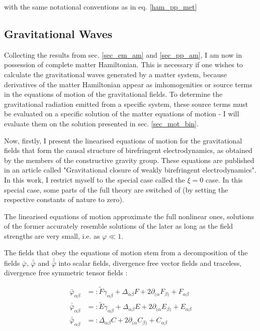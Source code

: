 \documentclass[11pt]{article}
\begin{document}
with the same notational conventions as in eq. \ref{ham_pp_met}

\subsection{Gravitational Waves}

Collecting the results from sec. \ref{sec_em_am} and \ref{sec_pp_am}, I am now in possession of complete matter Hamiltonian. This is necessary if one wishes to calculate the gravitational waves generated by a matter system, because derivatives of the matter Hamiltonian appear as imhomogenities or source terms in the equations of motion of the gravitational fields. To determine the gravitational radiation emitted from a specific system, these source terms must be evaluated on a specific solution of the matter equations of motion - I will evaluate them on the solution presented in sec. \ref{sec_mot_bin}.

Now, firstly, I present the linearised equations of motion for the gravitational fields that form the causal structure of birefringent electrodynamics, as obtained by the members of the constructive gravity group. These equations are published in an article called "Gravitational closure of weakly birefringent electrodynamics". In this work, I restrict myself to the special case called the $\xi = 0$ case. In this special case, some parts of the full theory are switched of (by setting the respective constants of nature to zero).

The linearised equations of motion approximate the full nonlinear ones, solutions of the former accurately resemble solutions of the later as long as the field strengths are very small, i.e. as $\varphi \ll 1$.

The fields that obey the equations of motion stem from a decomposition of the fields $\bar{\varphi}$, $\bar{\bar{\varphi}}$ and $\bar{\bar{\bar{\varphi}}}$ into scalar fields, divergence free vector fields and traceless, divergence free  symmetric tensor fields :

\begin{align}
	\bar{\varphi}_{\alpha \beta} 
	&=: 
	\tilde{F} \gamma_{\alpha \beta} 
	+ \Delta_{\alpha \beta} F 
	+  2 \partial_{ ( \alpha} F_{\beta )} 
	+  F_{\alpha \beta} \label{def_F}  \\
	\bar{\bar{\varphi}}_{\alpha \beta} 
	&=:
	\tilde{E} \gamma_{\alpha \beta} 
	+ \Delta_{\alpha \beta} E 
	+  2 \partial_{ ( \alpha} E_{\beta )} 
	+  E_{\alpha \beta} \label{def_E} \\
	\bar{\bar{\varphi}}_{\alpha \beta} 
	&=: 
	\Delta_{\alpha \beta} C 
	+  2 \partial_{ ( \alpha} C_{\beta )} 
	+  C_{\alpha \beta} \label{def_C}
\end{align}
\end{document}
